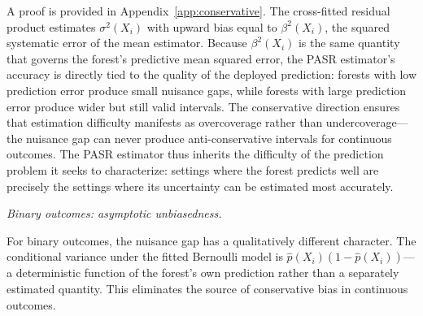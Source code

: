 \documentclass[11pt]{article}
\theoremstyle{plain}
\theoremstyle{definition}
\theoremstyle{remark}
\begin{document}
A proof is provided in Appendix~\ref{app:conservative}. The cross-fitted residual product estimates $\sigma^2(X_i)$ with upward bias equal to $\beta^2(X_i)$, the squared systematic error of the mean estimator. Because $\beta^2(X_i)$ is the same quantity that governs the forest's predictive mean squared error, the PASR estimator's accuracy is directly tied to the quality of the deployed prediction: forests with low prediction error produce small nuisance gaps, while forests with large prediction error produce wider but still valid intervals. The conservative direction ensures that estimation difficulty manifests as overcoverage rather than undercoverage---the nuisance gap can never produce anti-conservative intervals for continuous outcomes. The PASR estimator thus inherits the difficulty of the prediction problem it seeks to characterize: settings where the forest predicts well are precisely the settings where its uncertainty can be estimated most accurately.

\medskip
\noindent\textit{Binary outcomes: asymptotic unbiasedness.}\quad

For binary outcomes, the nuisance gap has a qualitatively different character. The conditional variance under the fitted Bernoulli model is $\hat{p}(X_i)(1 - \hat{p}(X_i))$---a deterministic function of the forest's own prediction rather than a separately estimated quantity. This eliminates the source of conservative bias in continuous outcomes.
\end{document}
